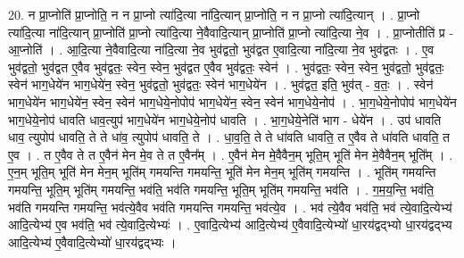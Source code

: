 \documentclass[17pt]{extarticle}
\begin{document}
20. न प्रा॒प्नोति॑ प्रा॒प्नोति॒ न न प्रा॒प्नो त्या॑दि॒त्या ना॑दि॒त्यान् प्रा॒प्नोति॒ न न प्रा॒प्नो त्या॑दि॒त्यान् । . प्रा॒प्नो त्या॑दि॒त्या ना॑दि॒त्यान् प्रा॒प्नोति॑ प्रा॒प्नो त्या॑दि॒त्या ने॒वैवादि॒त्यान् प्रा॒प्नोति॑ प्रा॒प्नो त्या॑दि॒त्या ने॒व । . प्रा॒प्नोतीति॑ प्र - आ॒प्नोति॑ । . आ॒दि॒त्या ने॒वैवादि॒त्या ना॑दि॒त्या ने॒व भुव॑द्वतो॒ भुव॑द्वत ए॒वादि॒त्या ना॑दि॒त्या ने॒व भुव॑द्वतः । . ए॒व भुव॑द्वतो॒ भुव॑द्वत ए॒वैव भुव॑द्वतः॒ स्वेन॒ स्वेन॒ भुव॑द्वत ए॒वैव भुव॑द्वतः॒ स्वेन॑ । . भुव॑द्वतः॒ स्वेन॒ स्वेन॒ भुव॑द्वतो॒ भुव॑द्वतः॒ स्वेन॑ भाग॒धेये॑न भाग॒धेये॑न॒ स्वेन॒ भुव॑द्वतो॒ भुव॑द्वतः॒ स्वेन॑ भाग॒धेये॑न । . भुव॑द्वत॒ इति॒ भुव॑त् - व॒तः॒ । . स्वेन॑ भाग॒धेये॑न भाग॒धेये॑न॒ स्वेन॒ स्वेन॑ भाग॒धेये॒नोपोप॑ भाग॒धेये॑न॒ स्वेन॒ स्वेन॑ भाग॒धेये॒नोप॑ । . भा॒ग॒धेये॒नोपोप॑ भाग॒धेये॑न भाग॒धेये॒नोप॑ धावति धाव॒त्युप॑ भाग॒धेये॑न भाग॒धेये॒नोप॑ धावति । . भा॒ग॒धेये॒नेति॑ भाग - धेये॑न । . उप॑ धावति धाव॒ त्युपोप॑ धावति॒ ते ते धा॑व॒ त्युपोप॑ धावति॒ ते । . धा॒व॒ति॒ ते ते धा॑वति धावति॒ त ए॒वैव ते धा॑वति धावति॒ त ए॒व । . त ए॒वैव ते त ए॒वैन॑ मेन मे॒व ते त ए॒वैन᳚म् । . ए॒वैन॑ मेन मे॒वैवैन॒म् भूति॒म् भूति॑ मेन मे॒वैवैन॒म् भूति᳚म् । . ए॒न॒म् भूति॒म् भूति॑ मेन मेन॒म् भूति॑म् गमयन्ति गमयन्ति॒ भूति॑ मेन मेन॒म् भूति॑म् गमयन्ति । . भूति॑म् गमयन्ति गमयन्ति॒ भूति॒म् भूति॑म् गमयन्ति॒ भव॑ति॒ भव॑ति गमयन्ति॒ भूति॒म् भूति॑म् गमयन्ति॒ भव॑ति । . ग॒म॒य॒न्ति॒ भव॑ति॒ भव॑ति गमयन्ति गमयन्ति॒ भव॑त्ये॒वैव भव॑ति गमयन्ति गमयन्ति॒ भव॑त्ये॒व । . भव॑ त्ये॒वैव भव॑ति॒ भव॑ त्ये॒वादि॒त्येभ्य॑ आदि॒त्येभ्य॑ ए॒व भव॑ति॒ भव॑ त्ये॒वादि॒त्येभ्यः॑ । . ए॒वादि॒त्येभ्य॑ आदि॒त्येभ्य॑ ए॒वैवादि॒त्येभ्यो॑ धा॒रय॑द्वद्भ्यो धा॒रय॑द्वद्भ्य आदि॒त्येभ्य॑ ए॒वैवादि॒त्येभ्यो॑ धा॒रय॑द्वद्भ्यः । \newline
\end{document}
